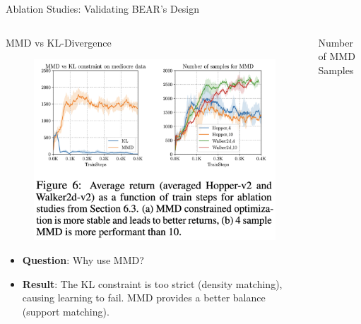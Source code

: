 \documentclass[11pt]{beamer}
\newcommand{\tb}[1]{\textbf{#1}}
\begin{document}
\begin{frame}{Ablation Studies: Validating BEAR's Design}
    \begin{columns}[T]
        \begin{column}{.5\textwidth}
            \begin{block}{MMD vs KL-Divergence}
                \begin{figure}
                 \includegraphics[width=\textwidth]{Figure6.png}
                \end{figure}
                 \begin{itemize}
                     \item \tb{Question}: Why use MMD?
                     \item \tb{Result}: The KL constraint is too strict (density matching), causing learning to fail. MMD provides a better balance (support matching).
                 \end{itemize}
            \end{block}
        \end{column}
        \begin{column}{.5\textwidth}
            \begin{block}{Number of MMD Samples}
                 \begin{figure}

\end{figure}
\end{block}
\end{column}
\end{columns}
\end{frame}
\end{document}
